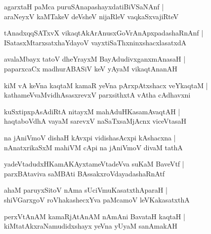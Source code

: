 \begin{shloka}
agarxtaH paMca puruSAnapashayxdatiBiVSaNAnf |\\
araNeyxV kaMTakeV deVsheV nijaRleV vaqkaSxvajiRteV 
\end{shloka}

\begin{shloka}
tAnadxqqSATxvX vikaqtAkArAnusxGoVrAnApxpadashaRnAnf |\\
ISatasxMtarxsatxhaYdayoV vayxtiSaThxninxshacxlasatxdA
\end{shloka}

\begin{shloka}
avalaMbayx tatoV dheYrayxM BayAdudivxganxmAnasaH |\\
paparxcaCx madhurABASiV keV yAyaM vikaqtAnanAH
\end{shloka}

\begin{shloka}
kiM vA keVna kaqtaM kamaR yeVna pArxpAtxshacx veYkaqtaM |\\
kathameVvaMvidhAsasxrevxV parxsithxtA vAtha cAdhavxni
\end{shloka}

\begin{shloka}
kuSxtipxpAsAdiRtA nitayxM mahAduHKasamAvaqtAH |\\
haqtaboVdhA vayaM sarevxV naSaTxsaMjAcnx viceVtasaH
\end{shloka}

\begin{shloka}
na jAniVmoV dishaH kAvxpi vidishasAcxpi kAshacxna |\\
nAnatxrikaSxM mahiVM cApi na jAniVmoV divaM tathA 
\end{shloka}

\begin{shloka}
yadeVtadudxHKamAKAyxtameVtadeVva suKaM BaveVtf |\\
parxBAtaviva saMBAti BAssakxroVdayadashaRnAtf
\end{shloka}

\begin{shloka}
ahaM paruyxSitoV nAma sUciVmuKasatxthAparaH |\\
shiVGarxgoV roVhakashecxYva paMcamoV leVKakasatxthA
\end{shloka}

\begin{shloka}
perxVtAnAM kamaRjAtAnAM nAmAni BavataH kaqtaH |\\
kiMtatAkxraNamudidxshayx yeVna yUyaM sanAmakAH
\end{shloka}

